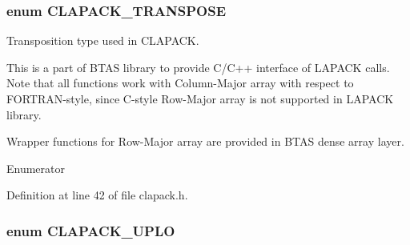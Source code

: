 \subsubsection[{C\-L\-A\-P\-A\-C\-K\-\_\-\-T\-R\-A\-N\-S\-P\-O\-S\-E}]{\setlength{\rightskip}{0pt plus 5cm}enum {\bf C\-L\-A\-P\-A\-C\-K\-\_\-\-T\-R\-A\-N\-S\-P\-O\-S\-E}}\label{d6/d79/clapack_8h_a776527171be1060b9d3b317980b06163}


Transposition type used in C\-L\-A\-P\-A\-C\-K. 

This is a part of B\-T\-A\-S library to provide C/\-C++ interface of L\-A\-P\-A\-C\-K calls. Note that all functions work with Column-\/\-Major array with respect to F\-O\-R\-T\-R\-A\-N-\/style, since C-\/style Row-\/\-Major array is not supported in L\-A\-P\-A\-C\-K library.

Wrapper functions for Row-\/\-Major array are provided in B\-T\-A\-S dense array layer. \begin{Desc}
\item[Enumerator]\par
\begin{description}
\item[{\em 
Clapack\-No\-Trans\label{d6/d79/clapack_8h_a776527171be1060b9d3b317980b06163af9bdbed312126e943fbfee11f707997a}
}]\item[{\em 
Clapack\-Trans\label{d6/d79/clapack_8h_a776527171be1060b9d3b317980b06163a299766193c011a1484aa2b4a98c0cc4f}
}]\item[{\em 
Clapack\-Conj\-Trans\label{d6/d79/clapack_8h_a776527171be1060b9d3b317980b06163aa982171bf7f564dff843cb874828d406}
}]\end{description}
\end{Desc}


Definition at line 42 of file clapack.\-h.

\subsubsection[{C\-L\-A\-P\-A\-C\-K\-\_\-\-U\-P\-L\-O}]{\setlength{\rightskip}{0pt plus 5cm}enum {\bf C\-L\-A\-P\-A\-C\-K\-\_\-\-U\-P\-L\-O}}\label{d6/d79/clapack_8h_a5f70f27aedf5fd3d418c86b455ef4577}


